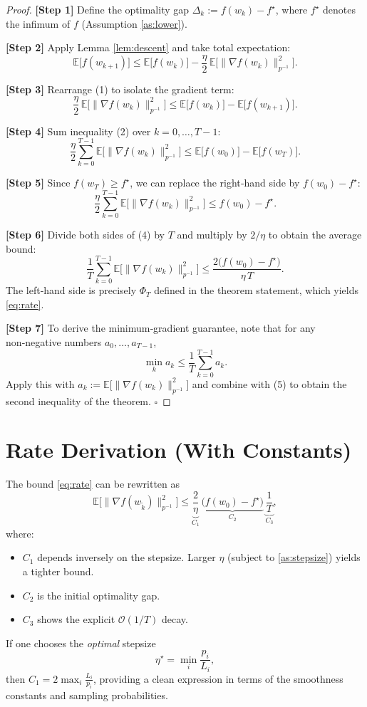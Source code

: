\documentclass{article}
\begin{document}
\begin{proof}
\textbf{[Step 1]} Define the optimality gap $\Delta_k:=f(w_k)-f^\star$, where $f^\star$ denotes the infimum of $f$ (Assumption \ref{as:lower}).  

\textbf{[Step 2]} Apply Lemma \ref{lem:descent} and take total expectation:
\[
\mathbb{E}\bigl[f(w_{k+1})\bigr]\le\mathbb{E}\bigl[f(w_k)\bigr]-\frac{\eta}{2}\,
\mathbb{E}\!\bigl[\|\nabla f(w_k)\|_{p^{-1}}^{2}\bigr].
\tag{1}
\]

\textbf{[Step 3]} Rearrange (1) to isolate the gradient term:
\[
\frac{\eta}{2}\,
\mathbb{E}\!\bigl[\|\nabla f(w_k)\|_{p^{-1}}^{2}\bigr]
\le \mathbb{E}\bigl[f(w_k)\bigr]-\mathbb{E}\bigl[f(w_{k+1})\bigr].
\tag{2}
\]

\textbf{[Step 4]} Sum inequality (2) over $k=0,\dots,T-1$:
\[
\frac{\eta}{2}\sum_{k=0}^{T-1}\mathbb{E}\!\bigl[\|\nabla f(w_k)\|_{p^{-1}}^{2}\bigr]
\le \mathbb{E}\bigl[f(w_0)\bigr]-\mathbb{E}\bigl[f(w_T)\bigr].
\tag{3}
\]

\textbf{[Step 5]} Since $f(w_T)\ge f^\star$, we can replace the right‑hand side by $f(w_0)-f^\star$:
\[
\frac{\eta}{2}\sum_{k=0}^{T-1}\mathbb{E}\!\bigl[\|\nabla f(w_k)\|_{p^{-1}}^{2}\bigr]
\le f(w_0)-f^\star.
\tag{4}
\]

\textbf{[Step 6]} Divide both sides of (4) by $T$ and multiply by $2/\eta$ to obtain the average bound:
\[
\frac{1}{T}\sum_{k=0}^{T-1}\mathbb{E}\!\bigl[\|\nabla f(w_k)\|_{p^{-1}}^{2}\bigr]
\le \frac{2\bigl(f(w_0)-f^\star\bigr)}{\eta\,T}.
\tag{5}
\]
The left‑hand side is precisely $\Phi_T$ defined in the theorem statement, which yields \eqref{eq:rate}.

\textbf{[Step 7]} To derive the minimum‑gradient guarantee, note that for any non‑negative numbers $a_0,\dots,a_{T-1}$,
\[
\min_{k} a_k \le \frac{1}{T}\sum_{k=0}^{T-1}a_k.
\]
Apply this with $a_k:=\mathbb{E}\!\bigl[\|\nabla f(w_k)\|_{p^{-1}}^{2}\bigr]$ and combine with (5) to obtain the second inequality of the theorem. $\square$
\end{proof}

\section*{Rate Derivation (With Constants)}
The bound \eqref{eq:rate} can be rewritten as
\[
\mathbb{E}\!\bigl[\|\nabla f(w_{\tilde{k}})\|_{p^{-1}}^{2}\bigr]
\le \underbrace{\frac{2}{\eta}}_{C_1}\,
\underbrace{\bigl(f(w_0)-f^\star\bigr)}_{C_2}\,
\underbrace{\frac{1}{T}}_{C_3},
\]
where:
\begin{itemize}
\item $C_1$ depends inversely on the stepsize.  Larger $\eta$ (subject to \eqref{as:stepsize}) yields a tighter bound.
\item $C_2$ is the initial optimality gap.
\item $C_3$ shows the explicit $\mathcal{O}(1/T)$ decay.
\end{itemize}
If one chooses the \emph{optimal} stepsize
\[
\eta^{\star}= \min_i \frac{p_i}{L_i},
\]
then $C_1=2\max_i \frac{L_i}{p_i}$, providing a clean expression in terms of the smoothness constants and sampling probabilities.
\end{document}
